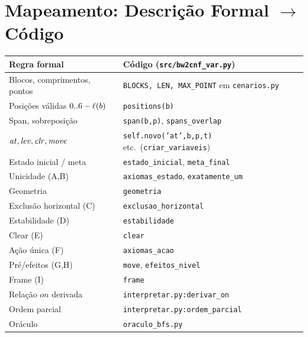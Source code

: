 \documentclass[11pt,a4paper]{article}
\newcommand{\at}{\mathit{at}}\newcommand{\lev}{\mathit{lev}}\newcommand{\clr}{\mathit{clr}}
\begin{document}
\section{Mapeamento: Descrição Formal $\to$ Código}
\begin{center}\small\begin{tabular}{@{}p{5.6cm}p{8.6cm}@{}}\toprule
Regra formal & Código (\texttt{src/bw2cnf\_var.py})\\\midrule
Blocos, comprimentos, pontos & \texttt{BLOCKS, LEN, MAX\_POINT} em \texttt{cenarios.py}\\
Posições válidas $0..6-\ell(b)$ & \texttt{positions(b)}\\
Span, sobreposição & \texttt{span(b,p)}, \texttt{spans\_overlap}\\
$\at,\lev,\clr,\mv$ & \texttt{self.novo('at',b,p,t)} etc.\ (\texttt{criar\_variaveis})\\
Estado inicial / meta & \texttt{estado\_inicial}, \texttt{meta\_final}\\
Unicidade (A,B) & \texttt{axiomas\_estado}, \texttt{exatamente\_um}\\
Geometria & \texttt{geometria}\\
Exclusão horizontal (C) & \texttt{exclusao\_horizontal}\\
Estabilidade (D) & \texttt{estabilidade}\\
Clear (E) & \texttt{clear}\\
Ação única (F) & \texttt{axiomas\_acao}\\
Pré/efeitos (G,H) & \texttt{move}, \texttt{efeitos\_nivel}\\
Frame (I) & \texttt{frame}\\
Relação $\mathit{on}$ derivada & \texttt{interpretar.py:derivar\_on}\\
Ordem parcial & \texttt{interpretar.py:ordem\_parcial}\\
Oráculo & \texttt{oraculo\_bfs.py}\\\bottomrule
\end{tabular}\end{center}

\end{document}

